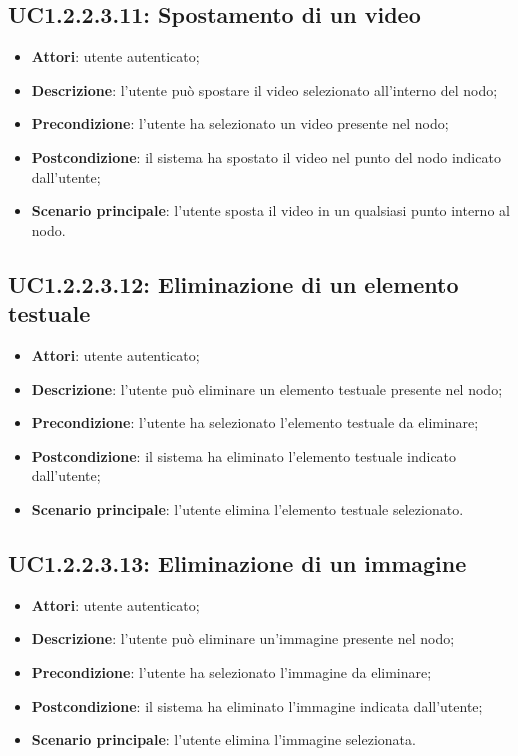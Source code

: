 \subsection{UC1.2.2.3.11: Spostamento di un video}
\label{UC1.2.2.3.11}
\begin{itemize}
\item \textbf{Attori}: utente autenticato;
\item \textbf{Descrizione}: l'utente può spostare il video selezionato all'interno del nodo;
\item \textbf{Precondizione}: l'utente ha selezionato un video presente nel nodo;
\item \textbf{Postcondizione}: il sistema ha spostato il video nel punto del nodo indicato dall'utente;
\item \textbf{Scenario principale}:
l'utente sposta il video in un qualsiasi punto interno al nodo.
\end{itemize}
\subsection{UC1.2.2.3.12: Eliminazione di un elemento testuale}
\label{UC1.2.2.3.12}
\begin{itemize}
\item \textbf{Attori}: utente autenticato;
\item \textbf{Descrizione}: l'utente può eliminare un elemento testuale presente nel nodo;
\item \textbf{Precondizione}: l'utente ha selezionato l'elemento testuale da eliminare;
\item \textbf{Postcondizione}: il sistema ha eliminato l'elemento testuale indicato dall'utente;
\item \textbf{Scenario principale}:
l'utente elimina l'elemento testuale selezionato.
\end{itemize}
\subsection{UC1.2.2.3.13: Eliminazione di un immagine}
\label{UC1.2.2.3.13}
\begin{itemize}
\item \textbf{Attori}: utente autenticato;
\item \textbf{Descrizione}: l'utente può eliminare un'immagine presente nel nodo;
\item \textbf{Precondizione}: l'utente ha selezionato l'immagine da eliminare;
\item \textbf{Postcondizione}: il sistema ha eliminato l'immagine indicata dall'utente;
\item \textbf{Scenario principale}:
l'utente elimina l'immagine selezionata.
\end{itemize}
